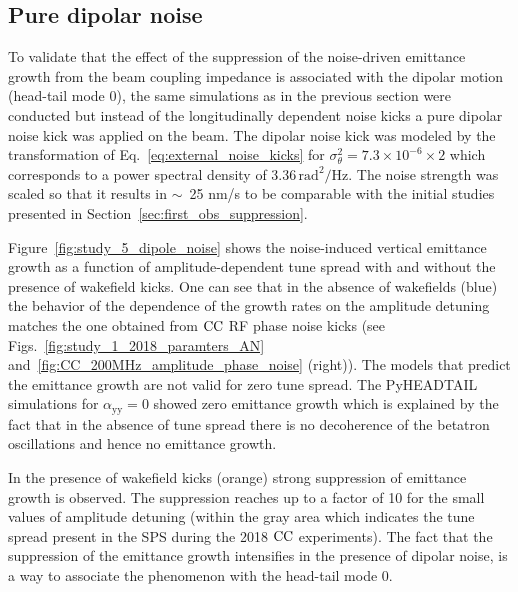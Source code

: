

\subsection{Pure dipolar noise}\label{subsec:dipole_noise}
To validate that the effect of the suppression of the noise-driven emittance growth from the beam coupling impedance is associated with the dipolar motion (head-tail mode 0), the same simulations as in the previous section were conducted but instead of the longitudinally dependent noise kicks a pure dipolar noise kick was applied on the beam. The dipolar noise kick was modeled by the transformation of Eq.~\eqref{eq:external_noise_kicks} for $\sigma_\theta^2=7.3\times 10^{-6} \times 2$ which corresponds to a power spectral density of 3.36\,$\mathrm{rad^2/Hz}$. The noise strength was scaled so that it results in $\sim$~25 nm/s to be comparable with the initial studies presented in Section~\ref{sec:first_obs_suppression}.

Figure~\ref{fig:study_5_dipole_noise} shows the noise-induced vertical emittance growth as a function of amplitude-dependent tune spread with and without the presence of wakefield kicks. One can see that in the absence of wakefields (blue) the behavior of the dependence of the growth rates on the amplitude detuning matches the one obtained from ${\mathrm{CC}}$ RF phase noise kicks (see Figs.~\ref{fig:study_1_2018_paramters_AN} and~\ref{fig:CC_200MHz_amplitude_phase_noise} (right)). The models that predict the emittance growth are not valid for zero tune spread. The PyHEADTAIL simulations for $\alpha_\mathrm{yy}=0$ showed zero emittance growth which is explained by the fact that in the absence of tune spread there is no decoherence of the betatron oscillations and hence no emittance growth. 


In the presence of wakefield kicks (orange) strong suppression of emittance growth is observed. The suppression reaches up to a factor of 10 for the small values of amplitude detuning (within the gray area which indicates the tune spread present in the SPS during the 2018 ${\mathrm{CC}}$ experiments). The fact that the suppression of the emittance growth intensifies in the presence of dipolar noise, is a way to associate the phenomenon with the head-tail mode 0.

